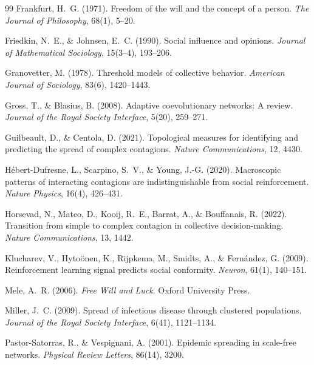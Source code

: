 \documentclass[11pt, a4paper]{article}
\begin{document}
\begin{thebibliography}{99}
Frankfurt, H.~G. (1971).
Freedom of the will and the concept of a person.
\textit{The Journal of Philosophy}, 68(1), 5--20.

Friedkin, N.~E., \& Johnsen, E.~C. (1990).
Social influence and opinions.
\textit{Journal of Mathematical Sociology}, 15(3--4), 193--206.

Granovetter, M. (1978).
Threshold models of collective behavior.
\textit{American Journal of Sociology}, 83(6), 1420--1443.

Gross, T., \& Blasius, B. (2008).
Adaptive coevolutionary networks: A review.
\textit{Journal of the Royal Society Interface}, 5(20), 259--271.

Guilbeault, D., \& Centola, D. (2021).
Topological measures for identifying and predicting the spread of complex contagions.
\textit{Nature Communications}, 12, 4430.

H\'{e}bert-Dufresne, L., Scarpino, S.~V., \& Young, J.-G. (2020).
Macroscopic patterns of interacting contagions are indistinguishable from social reinforcement.
\textit{Nature Physics}, 16(4), 426--431.

Horsevad, N., Mateo, D., Kooij, R.~E., Barrat, A., \& Bouffanais, R. (2022).
Transition from simple to complex contagion in collective decision-making.
\textit{Nature Communications}, 13, 1442.

Klucharev, V., Hyto\"{o}nen, K., Rijpkema, M., Smidts, A., \& Fern\'{a}ndez, G. (2009).
Reinforcement learning signal predicts social conformity.
\textit{Neuron}, 61(1), 140--151.

Mele, A.~R. (2006).
\textit{Free Will and Luck}.
Oxford University Press.

Miller, J.~C. (2009).
Spread of infectious disease through clustered populations.
\textit{Journal of the Royal Society Interface}, 6(41), 1121--1134.

Pastor-Satorras, R., \& Vespignani, A. (2001).
Epidemic spreading in scale-free networks.
\textit{Physical Review Letters}, 86(14), 3200.


\end{thebibliography}
\end{document}
